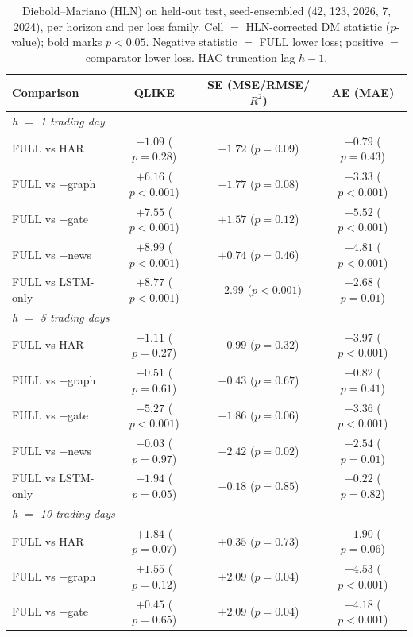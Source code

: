 \documentclass[runningheads]{llncs}
\begin{document}
\begin{table}[t]
\caption{Diebold--Mariano (HLN) on held-out test, seed-ensembled (42, 123, 2026, 7, 2024), per horizon and
per loss family. Cell $=$ HLN-corrected DM statistic ($p$-value); bold marks $p<0.05$. Negative statistic
$=$ FULL lower loss; positive $=$ comparator lower loss. HAC truncation lag $h{-}1$.}
\label{tab:dm}
\centering
\begin{tabular}{lccc}
\toprule
Comparison & QLIKE & SE (MSE/RMSE/$R^2$) & AE (MAE) \\
\midrule
\multicolumn{4}{l}{\emph{h $=$ 1 trading day}} \\
FULL vs HAR       & $-1.09$ (\(p=0.28\)) & $-1.72$ (\(p=0.09\)) & $+0.79$ (\(p=0.43\)) \\
FULL vs $-$graph  & $\mathbf{+6.16}$ (\(p<0.001\)) & $-1.77$ (\(p=0.08\)) & $\mathbf{+3.33}$ (\(p<0.001\)) \\
FULL vs $-$gate   & $\mathbf{+7.55}$ (\(p<0.001\)) & $+1.57$ (\(p=0.12\)) & $\mathbf{+5.52}$ (\(p<0.001\)) \\
FULL vs $-$news   & $\mathbf{+8.99}$ (\(p<0.001\)) & $+0.74$ (\(p=0.46\)) & $\mathbf{+4.81}$ (\(p<0.001\)) \\
FULL vs LSTM-only & $\mathbf{+8.77}$ (\(p<0.001\)) & $\mathbf{-2.99}$ (\(p<0.001\)) & $\mathbf{+2.68}$ (\(p=0.01\)) \\
\midrule
\multicolumn{4}{l}{\emph{h $=$ 5 trading days}} \\
FULL vs HAR       & $-1.11$ (\(p=0.27\)) & $-0.99$ (\(p=0.32\)) & $\mathbf{-3.97}$ (\(p<0.001\)) \\
FULL vs $-$graph  & $-0.51$ (\(p=0.61\)) & $-0.43$ (\(p=0.67\)) & $-0.82$ (\(p=0.41\)) \\
FULL vs $-$gate   & $\mathbf{-5.27}$ (\(p<0.001\)) & $-1.86$ (\(p=0.06\)) & $\mathbf{-3.36}$ (\(p<0.001\)) \\
FULL vs $-$news   & $-0.03$ (\(p=0.97\)) & $\mathbf{-2.42}$ (\(p=0.02\)) & $\mathbf{-2.54}$ (\(p=0.01\)) \\
FULL vs LSTM-only & $-1.94$ (\(p=0.05\)) & $-0.18$ (\(p=0.85\)) & $+0.22$ (\(p=0.82\)) \\
\midrule
\multicolumn{4}{l}{\emph{h $=$ 10 trading days}} \\
FULL vs HAR       & $+1.84$ (\(p=0.07\)) & $+0.35$ (\(p=0.73\)) & $-1.90$ (\(p=0.06\)) \\
FULL vs $-$graph  & $+1.55$ (\(p=0.12\)) & $\mathbf{+2.09}$ (\(p=0.04\)) & $\mathbf{-4.53}$ (\(p<0.001\)) \\
FULL vs $-$gate   & $+0.45$ (\(p=0.65\)) & $\mathbf{+2.09}$ (\(p=0.04\)) & $\mathbf{-4.18}$ (\(p<0.001\)) \\

\end{tabular}
\end{table}
\end{document}
